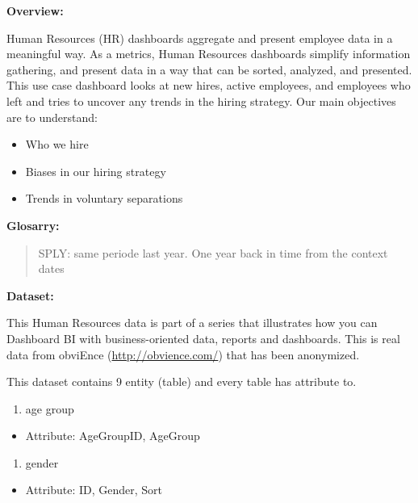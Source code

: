 \documentclass[]{book}
\providecommand{\tightlist}{%
  \setlength{\itemsep}{0pt}\setlength{\parskip}{0pt}}
\begin{document}
\textbf{Overview: }

Human Resources (HR) dashboards aggregate and present employee data in a
meaningful way. As a metrics, Human Resources dashboards simplify
information gathering, and present data in a way that can be sorted,
analyzed, and presented. This use case dashboard looks at new hires,
active employees, and employees who left and tries to uncover any trends
in the hiring strategy. Our main objectives are to understand:

\begin{itemize}
\tightlist
\item
  Who we hire
\item
  Biases in our hiring strategy
\item
  Trends in voluntary separations
\end{itemize}

\textbf{Glosarry: }

\begin{quote}
SPLY: same periode last year. One year back in time from the context
dates
\end{quote}

\textbf{Dataset: }

This Human Resources data is part of a series that illustrates how you
can Dashboard BI with business-oriented data, reports and dashboards.
This is real data from obviEnce (\url{http://obvience.com/}) that has
been anonymized.

This dataset contains 9 entity (table) and every table has attribute to.

\begin{enumerate}
\def\labelenumi{\arabic{enumi}.}
\tightlist
\item
  age group
\end{enumerate}

\begin{itemize}
\tightlist
\item
  Attribute: AgeGroupID, AgeGroup
\end{itemize}

\begin{enumerate}
\def\labelenumi{\arabic{enumi}.}
\setcounter{enumi}{1}
\tightlist
\item
  gender
\end{enumerate}

\begin{itemize}
\tightlist
\item
  Attribute: ID, Gender, Sort
\end{itemize}
\end{document}

